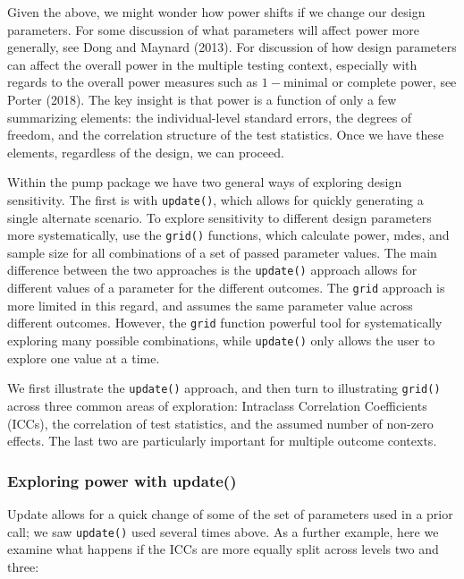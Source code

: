 \documentclass[
]{article}
\begin{document}
Given the above, we might wonder how power shifts if we change our
design parameters. For some discussion of what parameters will affect
power more generally, see Dong and Maynard (2013). For discussion of how
design parameters can affect the overall power in the multiple testing
context, especially with regards to the overall power measures such as
\(1-\)minimal or complete power, see Porter (2018). The key insight is
that power is a function of only a few summarizing elements: the
individual-level standard errors, the degrees of freedom, and the
correlation structure of the test statistics. Once we have these
elements, regardless of the design, we can proceed.

Within the pump package we have two general ways of exploring design
sensitivity. The first is with \texttt{update()}, which allows for
quickly generating a single alternate scenario. To explore sensitivity
to different design parameters more systematically, use the
\texttt{grid()} functions, which calculate power, mdes, and sample size
for all combinations of a set of passed parameter values. The main
difference between the two approaches is the \texttt{update()} approach
allows for different values of a parameter for the different outcomes.
The \texttt{grid} approach is more limited in this regard, and assumes
the same parameter value across different outcomes. However, the
\texttt{grid} function powerful tool for systematically exploring many
possible combinations, while \texttt{update()} only allows the user to
explore one value at a time.

We first illustrate the \texttt{update()} approach, and then turn to
illustrating \texttt{grid()} across three common areas of exploration:
Intraclass Correlation Coefficients (ICCs), the correlation of test
statistics, and the assumed number of non-zero effects. The last two are
particularly important for multiple outcome contexts.

\subsubsection{Exploring power with update()}

Update allows for a quick change of some of the set of parameters used
in a prior call; we saw \texttt{update()} used several times above. As a
further example, here we examine what happens if the ICCs are more
equally split across levels two and three:
\end{document}
